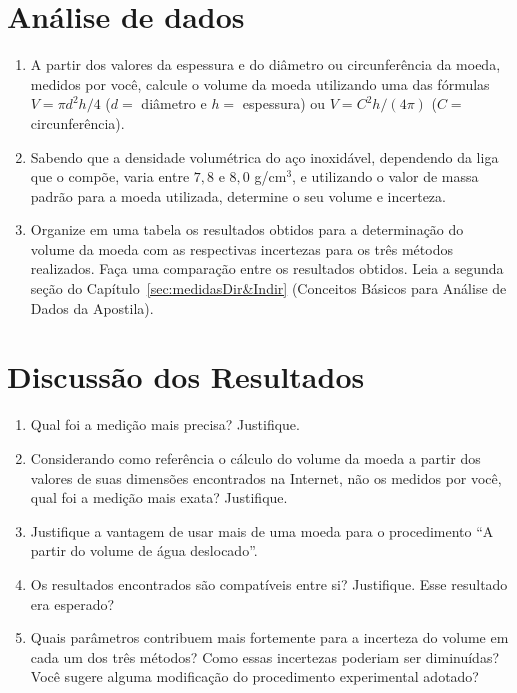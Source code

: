 \section{An\'alise de dados}
\begin{enumerate}
\item A partir dos valores  da espessura e do diâmetro ou circunferência da moeda,  medidos por você, calcule o volume da moeda utilizando uma das  fórmulas $V = \pi d^2 h/4  $ ($d =$ diâmetro e $h =$ espessura) ou $V=C^2 h/(4\pi)$ ($C =$ circunferência).

\item Sabendo que a densidade volumétrica do aço inoxid\'avel, dependendo da liga que o compõe, varia entre $7,8$ e $8,0$ g/cm$^3$, e utilizando o valor de massa padrão para a moeda utilizada, determine o seu volume e incerteza.
\item Organize em uma tabela os resultados obtidos para a determinação do volume da moeda com as respectivas incertezas para os três métodos realizados. Faça uma comparação entre os resultados obtidos. Leia  a segunda seção do Capítulo~\ref{sec:medidasDir&Indir} (Conceitos Básicos para Análise de Dados da Apostila). 
\end{enumerate}

\section{Discuss\~ao dos Resultados}
\begin{enumerate}
\item Qual foi a medição mais precisa? Justifique.
\item Considerando como referência o cálculo do volume da moeda a partir dos valores de suas dimensões encontrados na Internet, não os medidos por você, qual foi a medição mais exata? Justifique.
\item Justifique a vantagem de usar mais de uma moeda para o procedimento ``A partir do volume de água deslocado''.
\item   Os resultados encontrados são compatíveis entre si? Justifique. Esse resultado era esperado?
\item  Quais parâmetros contribuem mais fortemente para a incerteza do volume em cada um dos três métodos? Como essas incertezas poderiam ser diminuídas? Você sugere alguma modificação do procedimento experimental adotado?
\end{enumerate}



